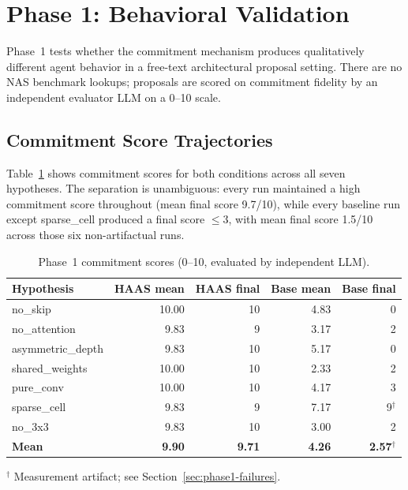 \section{Phase 1: Behavioral Validation}
\label{sec:phase1}

Phase~1 tests whether the commitment mechanism produces qualitatively different
agent behavior in a free-text architectural proposal setting. There are no NAS
benchmark lookups; proposals are scored on commitment fidelity by an independent
evaluator LLM on a 0--10 scale.

\subsection{Commitment Score Trajectories}
\label{sec:phase1-scores}

Table~\ref{tab:phase1} shows commitment scores for both conditions across all
seven hypotheses. The separation is unambiguous: every \haas{} run maintained a
high commitment score throughout (mean final score 9.7/10), while every baseline
run except sparse\_cell produced a final score $\leq 3$, with mean final score
1.5/10 across those six non-artifactual runs.

\begin{table}[t]
\caption{Phase~1 commitment scores (0--10, evaluated by independent LLM).}
\label{tab:phase1}
\begin{center}
\small
\begin{tabular}{lrrrr}
\toprule
\textbf{Hypothesis} & \textbf{HAAS mean} & \textbf{HAAS final} &
                      \textbf{Base mean} & \textbf{Base final} \\
\midrule
no\_skip          & 10.00 & 10 & 4.83 &  0 \\
no\_attention     &  9.83 &  9 & 3.17 &  2 \\
asymmetric\_depth &  9.83 & 10 & 5.17 &  0 \\
shared\_weights   & 10.00 & 10 & 2.33 &  2 \\
pure\_conv        & 10.00 & 10 & 4.17 &  3 \\
sparse\_cell      &  9.83 &  9 & 7.17 &  9$^\dagger$ \\
no\_3x3           &  9.83 & 10 & 3.00 &  2 \\
\midrule
\textbf{Mean}     &  \textbf{9.90} & \textbf{9.71} & \textbf{4.26} & \textbf{2.57}$^\dagger$ \\
\bottomrule
\end{tabular}
\end{center}
{\small $^\dagger$ Measurement artifact; see Section~\ref{sec:phase1-failures}.}
\end{table}

